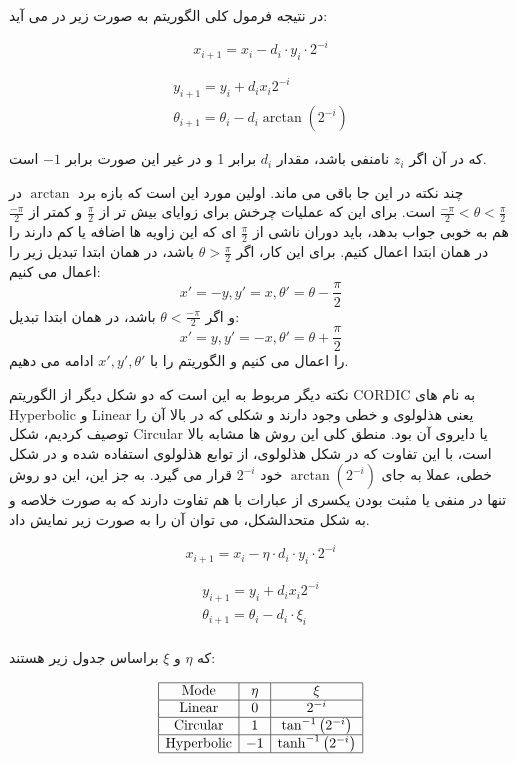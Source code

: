 \documentclass[12pt,titlepage,a4page , tikz , multi,table , svgnames,xcdraw]{article}
\begin{document}
در نتیجه فرمول کلی الگوریتم به صورت زیر در می آید:

$$x_{i+1}=x_{i}- d_{i} \cdot y_{i} \cdot 2^{-i}$$

$$\begin{array}{c}
y_{i+1}=y_{i}+d_{i} x_{i} 2^{-i} \\
\theta_{i+1}=\theta_{i}-d_{i} \arctan(2^{-i})
\end{array}$$

که در آن اگر $z_i$ نامنفی باشد، مقدار $d_i$ برابر 1 و در غیر این صورت برابر $-1$ است.

چند نکته در این جا باقی می ماند. اولین مورد این است که بازه برد $\arctan$ در
$\frac{-\pi}{2} < \theta < \frac{\pi}{2}$
است. برای این که عملیات چرخش برای زوایای بیش تر از $\frac{\pi}{2}$ و کمتر از 
$\frac{-\pi}{2}$
هم به خوبی جواب بدهد، باید دوران ناشی از $\frac{\pi}{2}$ ای که این زاویه ها اضافه یا کم دارند را در همان ابتدا اعمال کنیم.
برای این کار، اگر 
$\theta > \frac{\pi}{2}$
باشد، در همان ابتدا تبدیل زیر را اعمال می کنیم:
$$x' = -y , y' = x , \theta' = \theta - \frac{\pi}{2}$$
و اگر $\theta < \frac{-\pi}{2}$ باشد، در همان ابتدا تبدیل:
$$x' = y , y' = -x , \theta' = \theta + \frac{\pi}{2}$$
را اعمال می کنیم و الگوریتم را با $x' , y' , \theta'$ ادامه می دهیم.

نکته دیگر مربوط به این است که دو شکل دیگر از الگوریتم CORDIC به نام های Hyperbolic و Linear یعنی هذلولوی و خطی وجود دارند و شکلی که در بالا آن را توصیف کردیم، شکل Circular یا دایروی آن بود. منطق کلی این روش ها مشابه بالا است، با این تفاوت که در شکل هذلولوی، از توابع هذلولوی استفاده شده و در شکل خطی، عملا به جای $\arctan(2^{-i})$ خود $2^{-i}$ قرار می گیرد. به جز این، این دو روش تنها در منفی یا مثبت بودن یکسری از عبارات با هم تفاوت دارند که به صورت خلاصه و به شکل متحدالشکل، می توان آن را به صورت زیر نمایش داد.

$$x_{i+1}=x_{i}- \eta \cdot d_{i} \cdot y_{i} \cdot 2^{-i}$$

$$\begin{array}{c}
y_{i+1}=y_{i}+d_{i} x_{i} 2^{-i} \\
\theta_{i+1}=\theta_{i}-d_{i} \cdot \xi_i \\
\end{array}$$

که $\eta$ و $\xi$ براساس جدول زیر هستند:

$$\begin{array}{|c|c|c|}
\hline \text { Mode } & \eta & \xi \\
\hline \text {Linear} & 0 & 2^{-i} \\
\hline \text {Circular} & 1 & \tan ^{-1}\left(2^{-i}\right) \\
\hline \text {Hyperbolic} & -1 & \tanh ^{-1}\left(2^{-i}\right) \\
\hline
\end{array}$$
\end{document}
